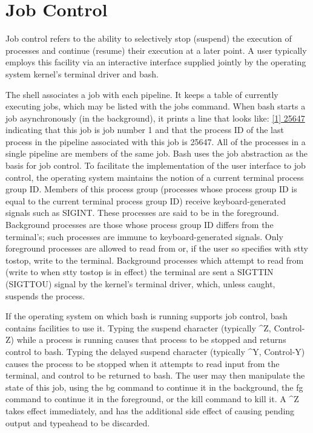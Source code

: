 \section{Job Control}\label{sec:jobcontrol}
Job control refers to the ability to selectively stop (suspend) the execution of processes and continue (resume) their execution at a later point. A user typically employs this facility via an interactive interface supplied jointly by the operating system kernel's terminal driver and bash.

The shell associates a job with each pipeline. It keeps a table of currently executing jobs, which may be listed with the jobs command. When bash starts a job asynchronously (in the background), it prints a line that looks like:
\url{[1] 25647}
indicating that this job is job number 1 and that the process ID of the last process in the pipeline associated with this job is 25647. All of the processes in a single pipeline are members of the same job. Bash uses the job abstraction as the basis for job control.
To facilitate the implementation of the user interface to job control, the operating system maintains the notion of a current terminal process group ID. Members of this process group (processes whose process group ID is equal to the current terminal process group ID) receive keyboard-generated signals such as SIGINT. These processes are said to be in the foreground. Background processes are those whose process group ID differs from the terminal's; such processes are immune to keyboard-generated signals. Only foreground processes are allowed to read from or, if the user so specifies with stty tostop, write to the terminal. Background processes which attempt to read from (write to when stty tostop is in effect) the terminal are sent a SIGTTIN (SIGTTOU) signal by the kernel's terminal driver, which, unless caught, suspends the process.

If the operating system on which bash is running supports job control, bash contains facilities to use it. Typing the suspend character (typically \^{}Z, Control-Z) while a process is running causes that process to be stopped and returns control to bash. Typing the delayed suspend character (typically \^{}Y, Control-Y) causes the process to be stopped when it attempts to read input from the terminal, and control to be returned to bash. The user may then manipulate the state of this job, using the bg command to continue it in the background, the fg command to continue it in the foreground, or the kill command to kill it. A \^{}Z takes effect immediately, and has the additional side effect of causing pending output and typeahead to be discarded.

